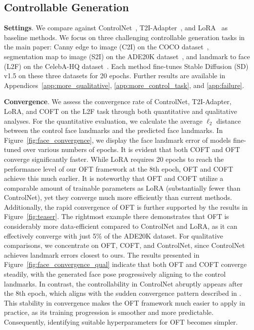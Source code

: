 \subsection{Controllable Generation}

\textbf{Settings}. We compare against ControlNet~\cite{zhang2023adding}, T2I-Adapter~\cite{mou2023t2i}, and LoRA~\cite{hulora2022} as baseline methods. We focus on three challenging controllable generation tasks in the main paper: Canny edge to image (C2I) on the COCO dataset~\cite{lin2014microsoft}, segmentation map to image (S2I) on the ADE20K dataset~\cite{zhou2017scene}, and landmark to face (L2F) on the CelebA-HQ dataset~\cite{karras2018progressive,xia2021tedigan}. Each method fine-tunes Stable Diffusion (SD) v1.5 on these three datasets for 20 epochs. Further results are available in Appendices~\ref{app:more_qualitative}, \ref{app:more_control_task}, and \ref{app:failure}.

\textbf{Convergence}. We assess the convergence rate of ControlNet, T2I-Adapter, LoRA, and COFT on the L2F task through both quantitative and qualitative analyses. For the quantitative evaluation, we calculate the average $\ell_2$ distance between the control face landmarks and the predicted face landmarks. In Figure~\ref{fig:face_convergence}, we display the face landmark error of models fine-tuned over various numbers of epochs. It is evident that both COFT and OFT converge significantly faster. While LoRA requires 20 epochs to reach the performance level of our OFT framework at the 8th epoch, OFT and COFT achieve this much earlier. It is noteworthy that OFT and COFT utilize a comparable amount of trainable parameters as LoRA (substantially fewer than ControlNet), yet they converge much more efficiently than current methods. Additionally, the rapid convergence of OFT is further supported by the results in Figure~\ref{fig:teaser}. The rightmost example there demonstrates that OFT is considerably more data-efficient compared to ControlNet and LoRA, as it can effectively converge with just 5\% of the ADE20K dataset. For qualitative comparisons, we concentrate on OFT, COFT, and ControlNet, since ControlNet achieves landmark errors closest to ours. The results presented in Figure~\ref{fig:face_convergence_qual} indicate that both OFT and COFT converge steadily, with the generated face pose progressively aligning to the control landmarks. In contrast, the controllability in ControlNet abruptly appears after the 8th epoch, which aligns with the sudden convergence pattern described in \cite{zhang2023adding}. This stability in convergence makes the OFT framework much easier to apply in practice, as its training progression is smoother and more predictable. Consequently, identifying suitable hyperparameters for OFT becomes simpler.

